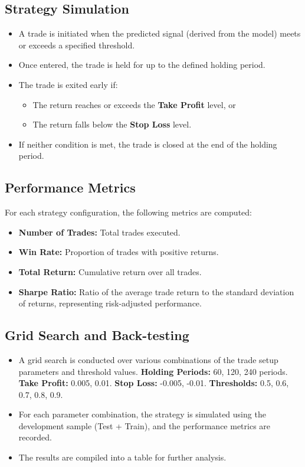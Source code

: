 \documentclass[11pt]{article}
\begin{document}
\subsection*{Strategy Simulation}
\begin{itemize}
    \item A trade is initiated when the predicted signal (derived from the model) meets or exceeds a specified threshold.
    \item Once entered, the trade is held for up to the defined holding period.
    \item The trade is exited early if:
    \begin{itemize}
         \item The return reaches or exceeds the \textbf{Take Profit} level, or
         \item The return falls below the \textbf{Stop Loss} level.
    \end{itemize}
    \item If neither condition is met, the trade is closed at the end of the holding period.
\end{itemize}

\subsection*{Performance Metrics}
For each strategy configuration, the following metrics are computed:
\begin{itemize}
    \item \textbf{Number of Trades:} Total trades executed.
    \item \textbf{Win Rate:} Proportion of trades with positive returns.
    \item \textbf{Total Return:} Cumulative return over all trades.
    \item \textbf{Sharpe Ratio:} Ratio of the average trade return to the standard deviation of returns, representing risk-adjusted performance.
\end{itemize}

\subsection*{Grid Search and Back-testing}
\begin{itemize}
    \item A grid search is conducted over various combinations of the trade setup parameters and threshold values.
    \textbf{Holding Periods:} 60, 120, 240 periods.
    \textbf{Take Profit:} 0.005, 0.01.
    \textbf{Stop Loss:} -0.005, -0.01.
    \textbf{Thresholds:} 0.5, 0.6, 0.7, 0.8, 0.9.
    
    \item For each parameter combination, the strategy is simulated using the development sample (Test + Train), and the performance metrics are recorded.
    \item The results are compiled into a table for further analysis.
\end{itemize}
\end{document}
